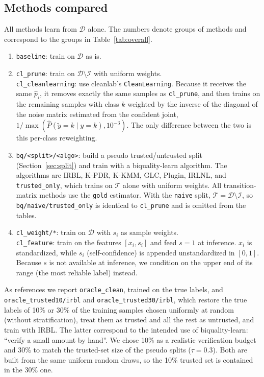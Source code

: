 \documentclass[a4paper,10pt]{article}
\newcommand{\method}[1]{\texttt{#1}}
\newcommand{\cl}{\textsf{cleanlab}}
\newcommand{\bq}{\textsf{biquality-learn}}
\begin{document}
\subsection{Methods compared}
All methods learn from $\mathcal{D}$ alone.
The numbers denote groups of methods and correspond to the groups in Table~\ref{tab:overall}.
\begin{enumerate}[label=(\arabic*)]
  \item \method{baseline}: train on $\mathcal{D}$ as is.
  \item \method{cl\_prune}: train on $\mathcal{D} \setminus \mathcal{I}$ with uniform weights.\\
        \method{cl\_cleanlearning}: use \cl{}'s \texttt{CleanLearning}. Because it receives the same $\hat{p}_i$, it removes exactly the same samples as \method{cl\_prune}, and then trains on the remaining samples with class $k$ weighted by the inverse of the diagonal of the noise matrix estimated from the confident joint, $1/\max(\hat{P}(\tilde{y}=k \mid y=k), 10^{-3})$. The only difference between the two is this per-class reweighting.
  \item \method{bq/<split>/<algo>}: build a pseudo trusted/untrusted split (Section~\ref{sec:split}) and train with a \bq{} algorithm. The algorithms are IRBL, K-PDR, K-KMM, GLC, Plugin, IRLNL, and \method{trusted\_only}, which trains on $\mathcal{T}$ alone with uniform weights. All transition-matrix methods use the \texttt{gold} estimator. With the \method{naive} split, $\mathcal{T} = \mathcal{D} \setminus \mathcal{I}$, so \method{bq/naive/trusted\_only} is identical to \method{cl\_prune} and is omitted from the tables.
  \item \method{cl\_weight/*}: train on $\mathcal{D}$ with $s_i$ as sample weights.\\
        \method{cl\_feature}: train on the features $[x_i, s_i]$ and feed $s=1$ at inference. $x_i$ is standardized, while $s_i$ (self-confidence) is appended unstandardized in $[0,1]$. Because $s$ is not available at inference, we condition on the upper end of its range (the most reliable label) instead.
\end{enumerate}
As references we report \method{oracle\_clean}, trained on the true labels, and \method{oracle\_trusted10/irbl} and \method{oracle\_trusted30/irbl}, which restore the true labels of 10\% or 30\% of the training samples chosen uniformly at random (without stratification), treat them as trusted and all the rest as untrusted, and train with IRBL.
The latter correspond to the intended use of \bq{}: ``verify a small amount by hand''.
We chose 10\% as a realistic verification budget and 30\% to match the trusted-set size of the pseudo splits ($\tau = 0.3$).
Both are built from the same uniform random draws, so the 10\% trusted set is contained in the 30\% one.
\end{document}
